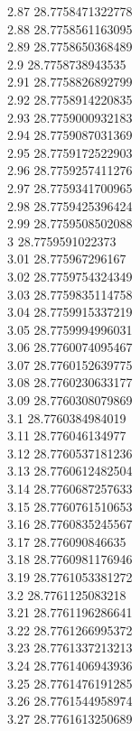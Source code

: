 {2.87	28.7758471322778\\
2.88	28.7758561163095\\
2.89	28.7758650368489\\
2.9	28.7758738943535\\
2.91	28.7758826892799\\
2.92	28.7758914220835\\
2.93	28.7759000932183\\
2.94	28.7759087031369\\
2.95	28.7759172522903\\
2.96	28.7759257411276\\
2.97	28.7759341700965\\
2.98	28.7759425396424\\
2.99	28.7759508502088\\
3	28.7759591022373\\
3.01	28.775967296167\\
3.02	28.7759754324349\\
3.03	28.7759835114758\\
3.04	28.7759915337219\\
3.05	28.7759994996031\\
3.06	28.7760074095467\\
3.07	28.7760152639775\\
3.08	28.7760230633177\\
3.09	28.7760308079869\\
3.1	28.7760384984019\\
3.11	28.776046134977\\
3.12	28.7760537181236\\
3.13	28.7760612482504\\
3.14	28.7760687257633\\
3.15	28.7760761510653\\
3.16	28.7760835245567\\
3.17	28.776090846635\\
3.18	28.7760981176946\\
3.19	28.7761053381272\\
3.2	28.7761125083218\\
3.21	28.7761196286641\\
3.22	28.7761266995372\\
3.23	28.7761337213213\\
3.24	28.7761406943936\\
3.25	28.7761476191285\\
3.26	28.7761544958974\\
3.27	28.7761613250689\\
}
